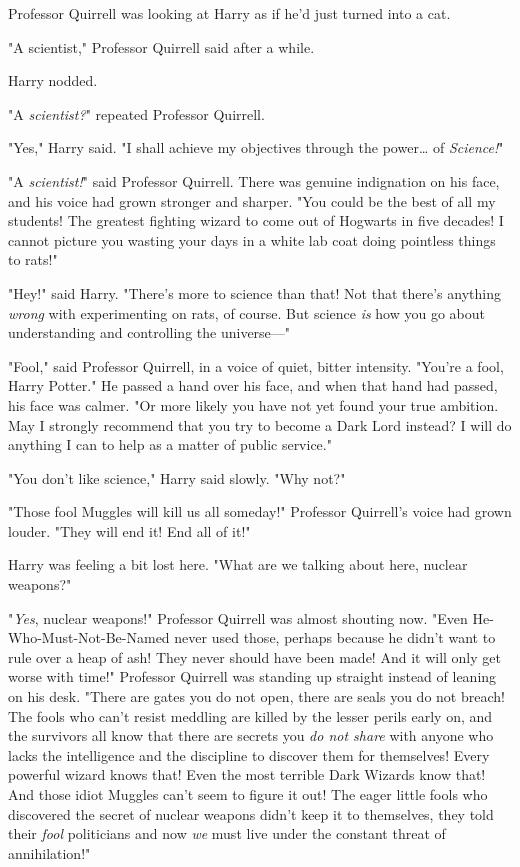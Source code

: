 Professor Quirrell was looking at Harry as if he'd just turned into a cat.

"A scientist," Professor Quirrell said after a while.

Harry nodded.

"A \emph{scientist?}" repeated Professor Quirrell.

"Yes," Harry said. "I shall achieve my objectives through the power{\ldots} of 
\emph{Science!}"

"A \emph{scientist!}" said Professor Quirrell. There was genuine indignation on 
his face, and his voice had grown stronger and sharper. "You could be the best 
of all my students! The greatest fighting wizard to come out of Hogwarts in 
five decades! I cannot picture you wasting your days in a white lab coat doing 
pointless things to rats!"

"Hey!" said Harry. "There's more to science than that! Not that there's 
anything \emph{wrong} with experimenting on rats, of course. But science 
\emph{is} how you go about understanding and controlling the universe---"

"Fool," said Professor Quirrell, in a voice of quiet, bitter intensity. "You're 
a fool, Harry Potter." He passed a hand over his face, and when that hand had 
passed, his face was calmer. "Or more likely you have not yet found your true 
ambition. May I strongly recommend that you try to become a Dark Lord instead? 
I will do anything I can to help as a matter of public service."

"You don't like science," Harry said slowly. "Why not?"

"Those fool Muggles will kill us all someday!" Professor Quirrell's voice had 
grown louder. "They will end it! End all of it!"

Harry was feeling a bit lost here. "What are we talking about here, nuclear 
weapons?"

"\emph{Yes}, nuclear weapons!" Professor Quirrell was almost shouting now. 
"Even He-Who-Must-Not-Be-Named never used those, perhaps because he didn't want 
to rule over a heap of ash! They never should have been made! And it will only 
get worse with time!" Professor Quirrell was standing up straight instead of 
leaning on his desk. "There are gates you do not open, there are seals you do 
not breach! The fools who can't resist meddling are killed by the lesser perils 
early on, and the survivors all know that there are secrets you \emph{do not 
share} with anyone who lacks the intelligence and the discipline to discover 
them for themselves! Every powerful wizard knows that! Even the most terrible 
Dark Wizards know that! And those idiot Muggles can't seem to figure it out! 
The eager little fools who discovered the secret of nuclear weapons didn't keep 
it to themselves, they told their \emph{fool} politicians and now \emph{we} 
must live under the constant threat of annihilation!"

